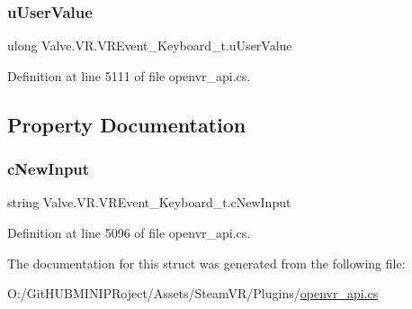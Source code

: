 \subsubsection{\texorpdfstring{uUserValue}{uUserValue}}
{\footnotesize\ttfamily ulong Valve.\+V\+R.\+V\+R\+Event\+\_\+\+Keyboard\+\_\+t.\+u\+User\+Value}



Definition at line 5111 of file openvr\+\_\+api.\+cs.



\subsection{Property Documentation}
\mbox{\label{struct_valve_1_1_v_r_1_1_v_r_event___keyboard__t_a21d76375c23f4d0648ae44690524d208}} 
\subsubsection{\texorpdfstring{cNewInput}{cNewInput}}
{\footnotesize\ttfamily string Valve.\+V\+R.\+V\+R\+Event\+\_\+\+Keyboard\+\_\+t.\+c\+New\+Input\hspace{0.3cm}{\ttfamily [get]}}



Definition at line 5096 of file openvr\+\_\+api.\+cs.



The documentation for this struct was generated from the following file\+:\begin{DoxyCompactItemize}
\item 
O\+:/\+Git\+H\+U\+B\+M\+I\+N\+I\+P\+Roject/\+Assets/\+Steam\+V\+R/\+Plugins/\mbox{\hyperlink{openvr__api_8cs}{openvr\+\_\+api.\+cs}}\end{DoxyCompactItemize}
